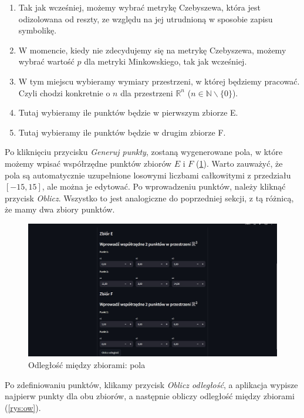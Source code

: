 \documentclass[article,11pt]{mwrep}
\newcommand{\R}{{\mathbb R}}
\newcommand{\N}{{\mathbb N}}
\begin{document}
\begin{enumerate}
    \item Tak jak wcześniej, możemy wybrać metrykę Czebyszewa, która jest odizolowana od reszty, ze względu na jej utrudnioną w sposobie zapisu symbolikę.
    \item W momencie, kiedy nie zdecydujemy się na metrykę Czebyszewa, możemy wybrać wartość $p$ dla metryki Minkowskiego, tak jak wcześniej.
    \item W tym miejscu wybieramy wymiary przestrzeni, w której będziemy pracować. Czyli chodzi konkretnie o $n$ dla przestrzeni $\R^n$ ($n\in\N\backslash \{0\} $).
    \item Tutaj wybieramy ile punktów będzie w pierwszym zbiorze E.
    \item Tutaj wybieramy ile punktów będzie w drugim zbiorze F.
\end{enumerate}

Po kliknięciu przycisku \textit{Generuj punkty}, zostaną wygenerowane pola, w które możemy wpisać współrzędne punktów zbiorów $E$ i $F$ (\ref{rys:op}). Warto zauważyć, że pola są automatycznie uzupełnione losowymi liczbami całkowitymi z przedziału $[-15,15]$, ale można je edytować. Po wprowadzeniu punktów, należy kliknąć przycisk \textit{Oblicz}. Wszystko to jest analogiczne do poprzedniej sekcji, z tą różnicą, że mamy dwa zbiory punktów.

\begin{figure}[H] 
    \centering
    \includegraphics[width=1\textwidth]{figure/Screenshot_6.jpg}
    \caption{Odległość między zbiorami: pola}\label{rys:op}
\end{figure}

Po zdefiniowaniu punktów, klikamy przycisk \textit{Oblicz odległość}, a aplikacja wypisze najpierw punkty dla obu zbiorów, a następnie obliczy odległość między zbiorami (\ref{rys:ow}).
\end{document}
